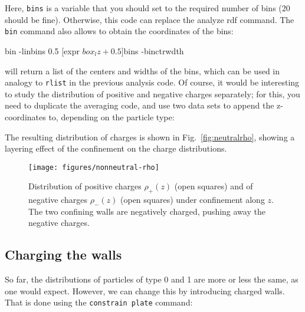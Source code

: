 \documentclass[
a4paper,                        %
11pt,                           %
twoside,                        %
footsepline,                    %
headsepline,                    %
headexclude,                    %
footexclude,                    %
pagesize,                       %
]{scrartcl}
\begin{document}

Here, \verb|bins| is a variable that you should set to the required
number of bins (20 should be fine). Otherwise, this code can replace
the analyze rdf command. The \verb|bin| command also allows to obtain
the coordinates of the bins:

\begin{tclcode}
  bin -linbins 0.5 [expr $box_lz + 0.5] $bins -binctrwdth
\end{tclcode}

will return a list of the centers and widths of the bins, which can be
used in analogy to \verb|rlist| in the previous analysis code. Of
course, it would be interesting to study the distribution of positive
and negative charges separately; for this, you need to duplicate the
averaging code, and use two data sets to append the z-coordinates to,
depending on the particle type:


The resulting distribution of charges is shown in
Fig.~\ref{fig:neutralrho}, showing a layering effect of the
confinement on the charge distributions.

\begin{figure}[t]
  \centering
  \texttt{[image: figures/nonneutral-rho]}
  \caption{Distribution of positive charges $\rho_+(z)$ (open squares)
    and of negative charges $\rho_-(z)$ (open squares) under
    confinement along $z$. The two confining walls are negatively
    charged, pushing away the negative charges.}
  \label{fig:nonneutralrho}
\end{figure}

\subsection*{Charging the walls}

So far, the distributions of particles of type 0 and 1 are more or
less the same, as one would expect. However, we can change this by
introducing charged walls. That is done using the
\verb|constrain plate| command:
\end{document}
